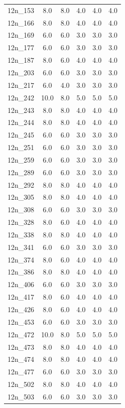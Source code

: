 \documentclass[12pt]{article}
\begin{document}
\begin{longtable}{lccccc}
12n\_153 & 8.0 & 8.0 & 4.0 & 4.0 & 4.0 \\
12n\_166 & 8.0 & 8.0 & 4.0 & 4.0 & 4.0 \\
12n\_169 & 6.0 & 6.0 & 3.0 & 3.0 & 3.0 \\
12n\_177 & 6.0 & 6.0 & 3.0 & 3.0 & 3.0 \\
12n\_187 & 8.0 & 6.0 & 4.0 & 4.0 & 4.0 \\
12n\_203 & 6.0 & 6.0 & 3.0 & 3.0 & 3.0 \\
12n\_217 & 6.0 & 4.0 & 3.0 & 3.0 & 3.0 \\
12n\_242 & 10.0 & 8.0 & 5.0 & 5.0 & 5.0 \\
12n\_243 & 8.0 & 8.0 & 4.0 & 4.0 & 4.0 \\
12n\_244 & 8.0 & 8.0 & 4.0 & 4.0 & 4.0 \\
12n\_245 & 6.0 & 6.0 & 3.0 & 3.0 & 3.0 \\
12n\_251 & 6.0 & 6.0 & 3.0 & 3.0 & 3.0 \\
12n\_259 & 6.0 & 6.0 & 3.0 & 3.0 & 3.0 \\
12n\_289 & 6.0 & 6.0 & 3.0 & 3.0 & 3.0 \\
12n\_292 & 8.0 & 8.0 & 4.0 & 4.0 & 4.0 \\
12n\_305 & 8.0 & 8.0 & 4.0 & 4.0 & 4.0 \\
12n\_308 & 6.0 & 6.0 & 3.0 & 3.0 & 3.0 \\
12n\_328 & 8.0 & 6.0 & 4.0 & 4.0 & 4.0 \\
12n\_338 & 8.0 & 8.0 & 4.0 & 4.0 & 4.0 \\
12n\_341 & 6.0 & 6.0 & 3.0 & 3.0 & 3.0 \\
12n\_374 & 8.0 & 6.0 & 4.0 & 4.0 & 4.0 \\
12n\_386 & 8.0 & 8.0 & 4.0 & 4.0 & 4.0 \\
12n\_406 & 6.0 & 6.0 & 3.0 & 3.0 & 3.0 \\
12n\_417 & 8.0 & 6.0 & 4.0 & 4.0 & 4.0 \\
12n\_426 & 8.0 & 6.0 & 4.0 & 4.0 & 4.0 \\
12n\_453 & 6.0 & 6.0 & 3.0 & 3.0 & 3.0 \\
12n\_472 & 10.0 & 8.0 & 5.0 & 5.0 & 5.0 \\
12n\_473 & 8.0 & 8.0 & 4.0 & 4.0 & 4.0 \\
12n\_474 & 8.0 & 8.0 & 4.0 & 4.0 & 4.0 \\
12n\_477 & 6.0 & 6.0 & 3.0 & 3.0 & 3.0 \\
12n\_502 & 8.0 & 8.0 & 4.0 & 4.0 & 4.0 \\
12n\_503 & 6.0 & 6.0 & 3.0 & 3.0 & 3.0 \\

\end{longtable}
\end{document}
